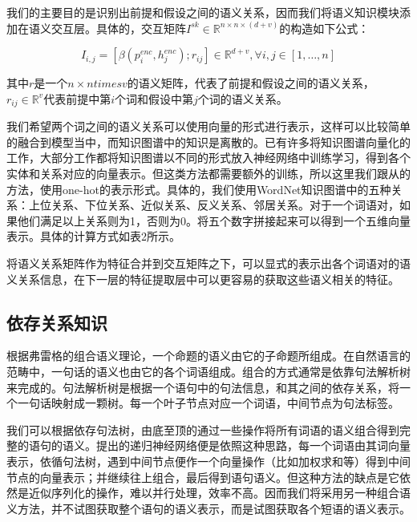 \documentclass[UTF8,11pt,a4paper,nofonts]{ctexart}
\begin{document}

我们的主要目的是识别出前提和假设之间的语义关系，因而我们将语义知识模块添加在语义交互层。具体的，交互矩阵$I^{sk} \in \mathbb{R}^{n \times n \times (d+v)}$的构造如下公式：

\begin{equation}
I_{i,j} = [\beta(p^{enc}_i, h^{enc}_j); r_{ij}] \in \mathbb{R}^{d+v}, \forall i, j \in [1,\dots,n]
\end{equation}

其中$r$是一个$n\times n times v$的语义矩阵，代表了前提和假设之间的语义关系，$r_{ij} \in \mathbb{R}^v$代表前提中第$i$个词和假设中第$j$个词的语义关系。

我们希望两个词之间的语义关系可以使用向量的形式进行表示，这样可以比较简单的融合到模型当中，而知识图谱中的知识是离散的。已有许多将知识图谱向量化的工作\cite{Lin2015LearningEA, Bordes2013TranslatingEF, }，大部分工作都将知识图谱以不同的形式放入神经网络中训练学习，得到各个实体和关系对应的向量表示。但这类方法都需要额外的训练，所以这里我们跟从\cite{Chen2017NaturalLI}的方法，使用one-hot的表示形式。具体的，我们使用WordNet知识图谱中的五种关系：上位关系、下位关系、近似关系、反义关系、邻居关系。对于一个词语对，如果他们满足以上关系则为1，否则为0。将五个数字拼接起来可以得到一个五维向量表示。具体的计算方式如表2所示。

将语义关系矩阵作为特征合并到交互矩阵之下，可以显式的表示出各个词语对的语义关系信息，在下一层的特征提取层中可以更容易的获取这些语义相关的特征。


\subsection{依存关系知识}

根据弗雷格的组合语义理论\cite{}，一个命题的语义由它的子命题所组成。在自然语言的范畴中，一句话的语义也由它的各个词语组成。组合的方式通常是依靠句法解析树来完成的。句法解析树是根据一个语句中的句法信息，和其之间的依存关系，将一个一句话映射成一颗树。每一个叶子节点对应一个词语，中间节点为句法标签。

我们可以根据依存句法树，由底至顶的通过一些操作将所有词语的语义组合得到完整的语句的语义。\cite{Socher2012SemanticCT}提出的递归神经网络便是依照这种思路，每一个词语由其词向量表示，依循句法树，遇到中间节点便作一个向量操作（比如加权求和等）得到中间节点的向量表示；并继续往上组合，最后得到语句语义。但这种方法的缺点是它依然是近似序列化的操作，难以并行处理，效率不高。因而我们将采用另一种组合语义方法，并不试图获取整个语句的语义表示，而是试图获取各个短语的语义表示。
\end{document}
